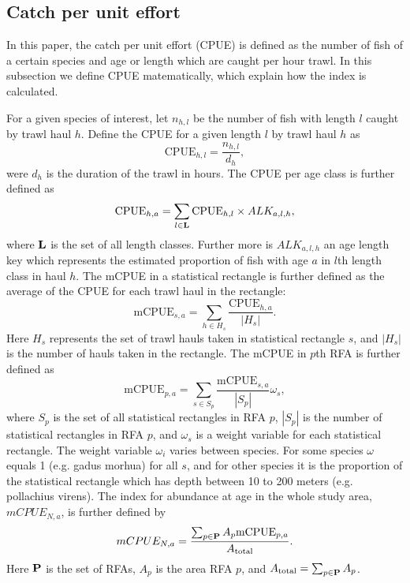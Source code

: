 \documentclass[a4paper 12pt]{article}
\numberwithin{equation}{section}
\begin{document}
\subsection{Catch per unit effort}
\label{sec:cpueestimators}
In this paper, the catch per unit effort (CPUE) is defined as the number of fish of a certain species and age or length which are caught per hour trawl. In this subsection we define CPUE matematically, which explain how the index is calculated. 

For a given species of interest, let $n_{h,l}$ be the number of fish with length $l$ caught by trawl haul $h$. Define the CPUE for a given length $l$ by trawl haul $h$ as 
\begin{equation}\label{eq:cpueHaul}
\mathrm{CPUE}_{h,l} =\frac{n_{h,l}}{d_h},
\end{equation}
were $d_h$ is the duration of the trawl in hours. The CPUE per age class is further defined as
\begin{equation}\label{eq:cpueALK}
\mathrm{CPUE}_{h,a} =\sum_{l \in {\bf L}}\mathrm{CPUE}_{h, l} \times ALK_{a,l,h},
\end{equation}
where ${\bf L}$ is the set of all length classes. Further more is $ALK_{a,l,h}$ an age length key which represents the estimated proportion of fish with age $a$ in $l$th length class in haul $h$. The mCPUE in a statistical rectangle is further defined as the average of the CPUE for each trawl haul in the rectangle:
\begin{equation}\label{eq:cpueRec}
\mathrm{mCPUE}_{s,a} =\sum_{h \in H_{s}}\frac{\mathrm{CPUE}_{h,a}}{|H_{s}|}.
\end{equation}
Here $H_{s}$ represents the set of trawl hauls taken in statistical rectangle $s$, and $|H_{s}|$ is the number of hauls taken in the rectangle. The mCPUE in $p$th RFA is further defined as
\begin{equation}\label{eq:cpueRFA}
\mathrm{mCPUE}_{p,a} = \sum_{s \in S_{p}} \frac{\mathrm{mCPUE}_{s,a}}{|S_{p}|} \omega_s,
\end{equation}
where $S_{p}$ is the set of all statistical rectangles in RFA $p$, $|S_{p}|$ is the number of statistical rectangles in RFA $p$, and $\omega_s$ is a weight variable for each statistical rectangle. The weight variable $\omega_i$ varies between species. For some species $\omega$ equals 1 (e.g. gadus morhua) for all $s$, and for other species it is the proportion of the statistical rectangle which has depth between 10 to 200 meters (e.g. pollachius virens).  The index for abundance at age in the whole study area, $mCPUE_{N,a} $, is further defined by
\begin{equation}
mCPUE_{N,a} = \frac{\sum_{p\in {\bf P}} A_{p}  \mathrm{mCPUE}_{p,a}}{A_{\text{total}}}.
\label{abundanceestimatornorthsea}
\end{equation}
Here ${\bf P}$ is the set of RFAs, $A_p$ is the area RFA $p$, and $A_{\text{total}} = \sum_{p\in {\bf P}} A_{p}$.
\end{document}
